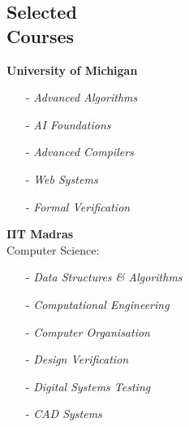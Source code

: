 \documentclass[margin,line,letter]{resume}
\begin{document}
\begin{resume}
\section{\mysidestyle Selected\\Courses}
    \vspace{-0.04cm}
    \begin{itemize*}
    \item \textbf{University of Michigan} \\
    \vspace{-0.7cm}
        \begin{multicols}{3}
        \begin{itemize}
        \item[-] \emph{Advanced Algorithms}
        \item[-] \emph{AI Foundations}
        \item[-] \emph{Advanced Compilers}
        \item[-] \emph{Web Systems}
        \item[-] \emph{Formal Verification}
        \end{itemize}
        \end{multicols}
    
    \vspace{-0.4cm}
    \item \textbf{IIT Madras}
        \vspace{0.15cm} \\
        \phantom{xx}\hspace{0ex} Computer Science:
        \vspace{-0.3cm}
        \begin{multicols}{2}
        \begin{itemize}
        \item[-] \emph{Data Structures \& Algorithms}
        \item[-] \emph{Computational Engineering}
        \item[-] \emph{Computer Organisation}
        \item[-] \emph{Design Verification}
        \item[-] \emph{Digital Systems Testing}
        \item[-] \emph{CAD Systems}
        \end{itemize}
        \end{multicols}
        

\end{itemize*}
\end{resume}
\end{document}
